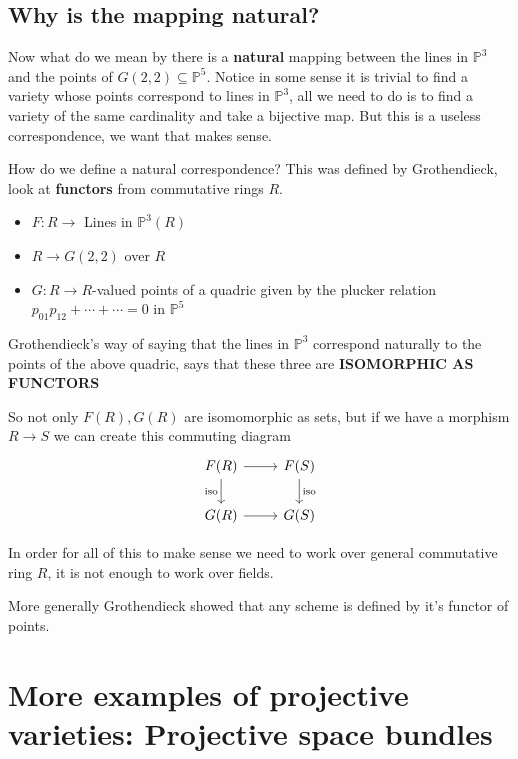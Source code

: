 \subsection{Why is the mapping natural?}
Now what do we mean by there is a \textbf{natural} mapping between the lines in $\mathbb{P}^3$ and the points of $G(2,2)\subseteq \mathbb{P}^5$. Notice in some sense it is trivial to find a variety whose points correspond to lines in $\mathbb{P}^3$, all we need to do is to find a variety of the same cardinality and take a bijective map. But this is a useless correspondence, we want that makes sense.

How do we define a natural correspondence? This was defined by Grothendieck, look at \textbf{functors} from commutative rings $R$. \begin{itemize}
    \item $F\colon R\rightarrow $ Lines in $\mathbb{P}^3(R)$
    \item $R \rightarrow G(2,2)$ over $R$
    \item $G\colon R\rightarrow R$-valued points of a quadric given by the plucker relation $p_{01}p_{12}+\cdots + \cdots  = 0$ in $\mathbb{P}^5$
\end{itemize}

Grothendieck's way of saying that the lines in $\mathbb{P}^3$ correspond naturally to the points of the above quadric, says that these three are \textbf{ISOMORPHIC AS FUNCTORS}

So not only $F(R), G(R)$ are isomomorphic as sets, but if we have a morphism $R\rightarrow S$ we can create this commuting diagram\[\begin{tikzcd}
    F(R) \arrow{r}{} \arrow[swap]{d}{\text{iso}} & F(S) \arrow{d}{\text{iso}} \\%
    G(R) \arrow{r}{}& G(S)
    \end{tikzcd}
    \]

In order for all of this to make sense we need to work over general commutative ring $R$, it is not enough to work over fields.

More generally Grothendieck showed that any scheme is defined by it's functor of points. 

\section{More examples of projective varieties: Projective space bundles}

